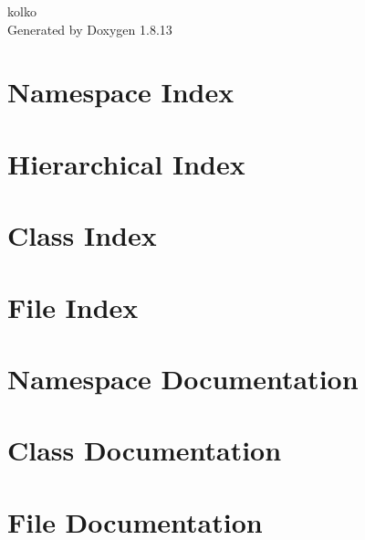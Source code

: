 \documentclass[twoside]{book}
\newcommand{\+}{\discretionary{\mbox{\scriptsize$\hookleftarrow$}}{}{}}
\newcommand{\clearemptydoublepage}{%
  \newpage{\pagestyle{empty}\cleardoublepage}%
}
\begin{document}
\hypersetup{pageanchor=false,
             bookmarksnumbered=true,
             pdfencoding=unicode
            }
\begin{titlepage}
\vspace*{7cm}
\begin{center}%
{\Large kolko }\\
\vspace*{1cm}
{\large Generated by Doxygen 1.8.13}\\
\end{center}
\end{titlepage}
\clearemptydoublepage
{}
\tableofcontents
\clearemptydoublepage
{}
\hypersetup{pageanchor=true}

\chapter{Namespace Index}

\chapter{Hierarchical Index}

\chapter{Class Index}

\chapter{File Index}

\chapter{Namespace Documentation}


\chapter{Class Documentation}


\chapter{File Documentation}














\backmatter
\newpage
{}
\clearemptydoublepage
{}
\printindex
\end{document}
